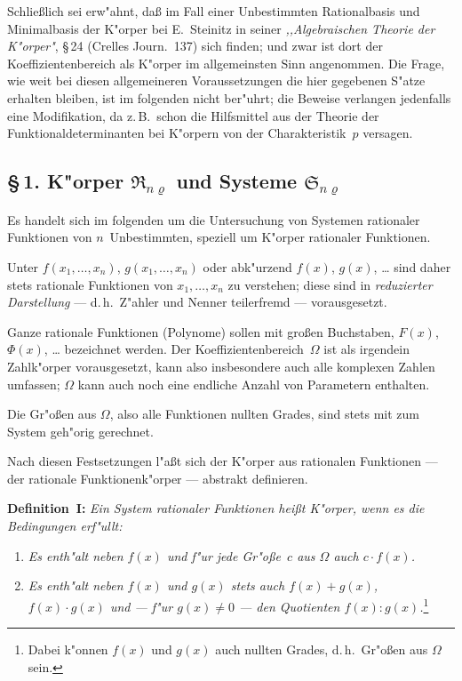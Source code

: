 \documentclass[11pt,a4paper]{article}
\begin{document}
Schlie\ss{}lich sei erw"{a}hnt, da\ss{} im Fall einer Unbestimmten Rationalbasis
und Minimalbasis der K"{o}rper bei E.~Steinitz in seiner \emph{,,Algebraischen
Theorie der K"{o}rper"{}}, \S\,24 (Crelles Journ.\ 137) sich finden; und zwar ist
dort der Koeffizientenbereich als K"{o}rper im allgemeinsten Sinn angenommen.
Die Frage, wie weit bei diesen allgemeineren Voraussetzungen
die hier gegebenen S"{a}tze erhalten bleiben, ist im folgenden nicht ber"{u}hrt;
die Beweise verlangen jedenfalls eine Modifikation, da z.\,B.\ schon die Hilfsmittel
aus der Theorie der Funktionaldeterminanten bei K"{o}rpern von der
Charakteristik~$p$ versagen.

\subsection*{\S\,1. K"{o}rper $\mathfrak{R}_{n\varrho}$ und Systeme $\mathfrak{S}_{n\varrho}$}

Es handelt sich im folgenden um die Untersuchung von Systemen
rationaler Funktionen von $n$~Unbestimmten, speziell um K"{o}rper rationaler
Funktionen.

Unter $f(x_{1},\dots,x_{n})$, $g(x_{1},\dots,x_{n})$ oder abk"{u}rzend $f(x)$, $g(x)$, \dots
sind daher stets rationale Funktionen von $x_{1},\dots,x_{n}$ zu verstehen; diese
sind in \emph{reduzierter Darstellung} --- d.\,h.\ Z"{a}hler und Nenner teilerfremd ---
vorausgesetzt.

Ganze rationale Funktionen (Polynome) sollen mit gro\ss{}en
Buchstaben, $F(x)$, $\Phi(x)$, \dots{} bezeichnet werden. Der Koeffizientenbereich~$\Omega$
ist als irgendein Zahlk"{o}rper vorausgesetzt, kann also insbesondere auch
alle komplexen Zahlen umfassen; $\Omega$ kann auch noch eine endliche Anzahl
von Parametern enthalten.

Die Gr"{o}\ss{}en aus $\Omega$, also alle Funktionen nullten Grades, sind stets
mit zum System geh"{o}rig gerechnet.

Nach diesen Festsetzungen l"{a}\ss{}t sich der K"{o}rper aus rationalen
Funktionen --- der rationale Funktionenk"{o}rper --- abstrakt definieren.

\medskip
\noindent
\textbf{Definition~I:} \emph{Ein System rationaler Funktionen hei\ss{}t \emph{K"{o}rper},
wenn es die Bedingungen erf"{u}llt:}
\begin{enumerate}
\item \emph{Es enth"{a}lt neben $f(x)$ und f"{u}r jede Gr"{o}\ss{}e~$c$ aus $\Omega$ auch $c\cdot f(x)$.}
\item \emph{Es enth"{a}lt neben $f(x)$ und $g(x)$ stets auch $f(x)+g(x)$,
$f(x)\cdot g(x)$ und --- f"{u}r $g(x)\neq 0$ --- den Quotienten $f(x):g(x)$.}\footnote{Dabei k"{o}nnen $f(x)$ und $g(x)$ auch nullten Grades, d.\,h.\ Gr"{o}\ss{}en aus $\Omega$ sein.}
\end{enumerate}
\end{document}
